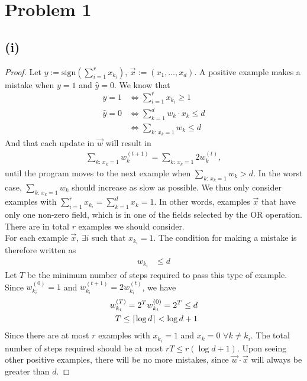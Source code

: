 \documentclass[twoside,11pt]{homework}
\date{02/28/2020}
\DeclarePairedDelimiter{\ceil}{\lceil}{\rceil}
\begin{document}
\maketitle

\section*{Problem 1} 
\subsection*{(i)}
	\begin{proof}
		Let $y := \text{sign} \left(\sum_{i=1}^{r}x_{k_i}\right)$, $\vec{x} := (x_1,\dots,x_d)$.
		A positive example makes a mistake when $y=1$ and $\hat{y}=0$. We know that
		\begin{align*}
			y=1 &\Longleftrightarrow \sum_{i=1}^{r}x_{k_i} \geq 1 \\
			\hat{y}=0 &\Longleftrightarrow \sum_{k=1}^{d} w_k \cdot x_{k} \leq d \\
			&\Longleftrightarrow \sum_{k: \,x_k=1} w_k  \leq d
		\end{align*}
		And that each update in $\vec{w}$ will result in
		\begin{align*}
			\sum_{k: \,x_k=1} w_k^{(t+1)}  = \sum_{k: \,x_k=1} 2w_k^{(t)},
		\end{align*}
		until the program moves to the next example when $\sum_{k: \,x_k=1} w_k  > d$. 
		In the worst case, $\sum_{k: \,x_k=1} w_k$ should increase as slow as possible.
		We thus only consider examples with $\sum_{i=1}^{r}x_{k_i}=\sum_{k=1}^{d} x_{k}=1$.
		In other words, examples $\vec{x}$ that have only one non-zero field, 
		which is in one of the fields selected by the OR operation.
		There are in total $r$ examples we should consider.\\
		For each example $\vec{x}$, $\exists i $ such that $x_{k_i} = 1$. 
		The condition for making a mistake is therefore written as
		\begin{align*}
			w_{k_i}  &\leq d
		\end{align*}
		Let $T$ be the minimum number of steps required to pass this type of example. 
		Since $w_{k_i} ^{(0)} = 1$ and $w_{k_i} ^{(t+1)} = 2w_{k_i} ^{(t)} $, we have
		\begin{align*}
			w_{k_i}^{(T)} =  2^T w_{k_i}^{(0)} =  2^T \leq d \\
			T\leq \ceil{\log{d}} < \log{d}+1
		\end{align*}
		Since there are at most $r$ examples with $x_{k_i} = 1$ and $x_k = 0$ $\forall k \neq k_i$. 
		The total number of steps required should be at most $rT \leq r(\log{d} + 1)$.
		Upon seeing other positive examples, there will be no more mistakes, since $\vec{w}\cdot\vec{x}$ will always be greater than $d$.
	\end{proof}
\end{document}
